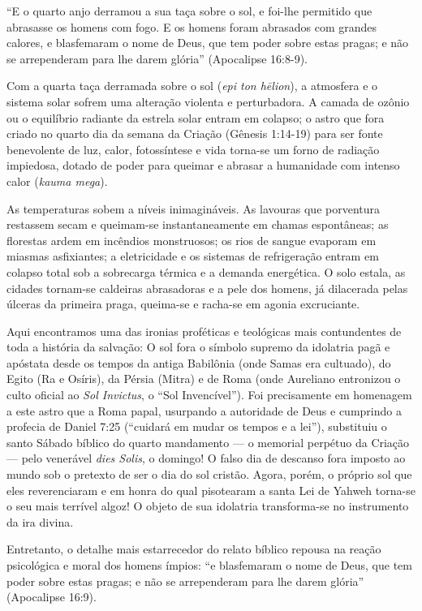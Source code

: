 ``E o quarto anjo derramou a sua taça sobre o sol, e foi-lhe permitido que abrasasse os homens com fogo. E os homens foram abrasados com grandes calores, e blasfemaram o nome de Deus, que tem poder sobre estas pragas; e não se arrependeram para lhe darem glória'' (Apocalipse 16:8-9).

Com a quarta taça derramada sobre o sol (\textit{epi ton hēlion}), a atmosfera e o sistema solar sofrem uma alteração violenta e perturbadora. A camada de ozônio ou o equilíbrio radiante da estrela solar entram em colapso; o astro que fora criado no quarto dia da semana da Criação (Gênesis 1:14-19) para ser fonte benevolente de luz, calor, fotossíntese e vida torna-se um forno de radiação impiedosa, dotado de poder para queimar e abrasar a humanidade com intenso calor (\textit{kauma mega}).

As temperaturas sobem a níveis inimagináveis. As lavouras que porventura restassem secam e queimam-se instantaneamente em chamas espontâneas; as florestas ardem em incêndios monstruosos; os rios de sangue evaporam em miasmas asfixiantes; a eletricidade e os sistemas de refrigeração entram em colapso total sob a sobrecarga térmica e a demanda energética. O solo estala, as cidades tornam-se caldeiras abrasadoras e a pele dos homens, já dilacerada pelas úlceras da primeira praga, queima-se e racha-se em agonia excruciante.

Aqui encontramos uma das ironias proféticas e teológicas mais contundentes de toda a história da salvação:
O sol fora o símbolo supremo da idolatria pagã e apóstata desde os tempos da antiga Babilônia (onde Samas era cultuado), do Egito (Ra e Osíris), da Pérsia (Mitra) e de Roma (onde Aureliano entronizou o culto oficial ao \textit{Sol Invictus}, o ``Sol Invencível'').
Foi precisamente em homenagem a este astro que a Roma papal, usurpando a autoridade de Deus e cumprindo a profecia de Daniel 7:25 (``cuidará em mudar os tempos e a lei''), substituiu o santo Sábado bíblico do quarto mandamento — o memorial perpétuo da Criação — pelo venerável \textit{dies Solis}, o domingo! O falso dia de descanso fora imposto ao mundo sob o pretexto de ser o dia do sol cristão. Agora, porém, o próprio sol que eles reverenciaram e em honra do qual pisotearam a santa Lei de Yahweh torna-se o seu mais terrível algoz! O objeto de sua idolatria transforma-se no instrumento da ira divina.

Entretanto, o detalhe mais estarrecedor do relato bíblico repousa na reação psicológica e moral dos homens ímpios:
``e blasfemaram o nome de Deus, que tem poder sobre estas pragas; e não se arrependeram para lhe darem glória'' (Apocalipse 16:9).


